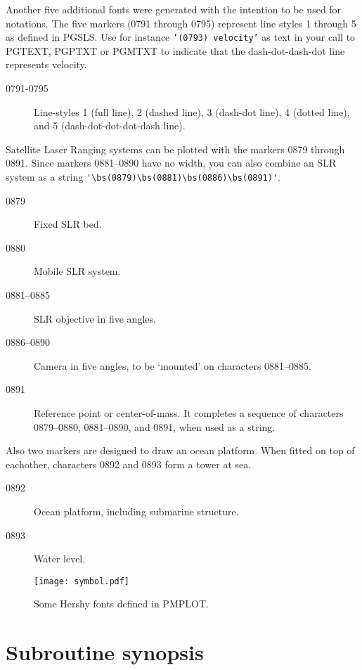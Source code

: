 \documentclass[titlepage,a4paper]{article}
\def\Input#1{\vbox{}}
\begin{document}
Another five additional
fonts were generated with the intention to be used for notations. The five
markers (0791 through 0795) represent line styles 1 through 5 as defined in
PGSLS. Use for instance {\tt'\bs(0793) velocity'}
as text in your call to PGTEXT,
PGPTXT or PGMTXT to indicate that the dash-dot-dash-dot line represents
velocity.
\begin{description}
\item[0791-0795] Line-styles 1 (full line), 2 (dashed line),
  3 (dash-dot line), 4 (dotted line), and 5 (dash-dot-dot-dot-dash line).
\end{description}

Satellite Laser Ranging systems can be plotted with the markers 0879
through 0891. Since markers 0881--0890 have no width, you can also
combine an SLR system as a string
\verb|'\bs(0879)\bs(0881)\bs(0886)\bs(0891)'|.
\begin{description}
\item[0879] Fixed SLR bed.
\item[0880] Mobile SLR system.
\item[0881--0885] SLR objective in five angles.
\item[0886--0890] Camera in five angles, to be `mounted' on characters
0881--0885.
\item[0891] Reference point or center-of-mass. It completes a sequence
of characters 0879--0880, 0881--0890, and 0891, when used as a string.
\end{description}

Also two markers are designed to draw an ocean platform. When fitted
on top of eachother, characters 0892 and 0893 form a tower at sea.
\begin{description}
\item[0892] Ocean platform, including submarine structure.
\item[0893] Water level.
\end{description}

\begin{figure*}[h]
\texttt{[image: symbol.pdf]}
\caption{Some Hershy fonts defined in PMPLOT.}
\label{fig:symbol}
\end{figure*}

\clearpage
\section{Subroutine synopsis}
\Input{grtcir}
\Input{pgclip}
\Input{pgnorm}
\Input{pgnumb}
\Input{pgpt}
\Input{pgptx}
\Input{pgsvpx}
\Input{pmbar}
\clearpage

\Input{pmcinv}
\Input{pmconv}
\Input{pmcvec}
\Input{pmcpol}

\Input{pmqdef}
\Input{pmqinf}
\Input{pmrnd}
\Input{pmwdb}
\Input{pmswin}
\Input{pmx}
\Input{pmy}
\Input{rngcir}
\Input{satobs}
\end{document}
